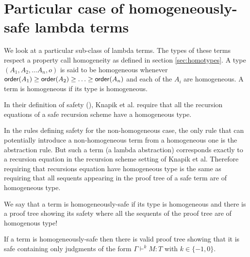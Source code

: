 \section{Particular case of homogeneously-safe lambda terms}

We look at a particular sub-class of lambda terms. The types of
these terms respect a property call homogeneity as defined in
section \ref{sec:homotypes}. A type $(A_1, A_2, \ldots A_n, o)$ is
said to be homogeneous whenever ${\sf order}(A_1) \geq {\sf order}(A_2) \geq
\ldots \geq  {\sf order}(A_n)$ and each of the $A_i$ are homogeneous. A
term is homogeneous if its type is homogeneous.


In their definition of safety (\cite{KNU02}), Knapik et al. require
that all the recursion equations of a safe recursion scheme have a
homogeneous type.

In the rules defining safety for the non-homogeneous case, the only
rule that can potentially introduce a non-homogeneous term from a
homogeneous one is the abstraction rule. But such a term (a lambda
abstraction) corresponds exactly to a recursion equation in the
recursion scheme setting of Knapik et al. Therefore requiring that
recursions equation have homogeneous type is the same as requiring
that all sequents appearing in the proof tree of a safe term are of
homogeneous type.

We say that a term is homogeneously-safe if its type is homogeneous
and there is a proof tree showing its safety where all the sequents
of the proof tree are of homogenous type!

\begin{lem}
\label{lem:homog_judg_zero_minusone} If a term is homogeneously-safe
then there is valid proof tree showing that it is safe containing
only judgments of the form $\Gamma \vdash^{k} M : T$ with $k\in
\{-1,0\}$.
\end{lem}

